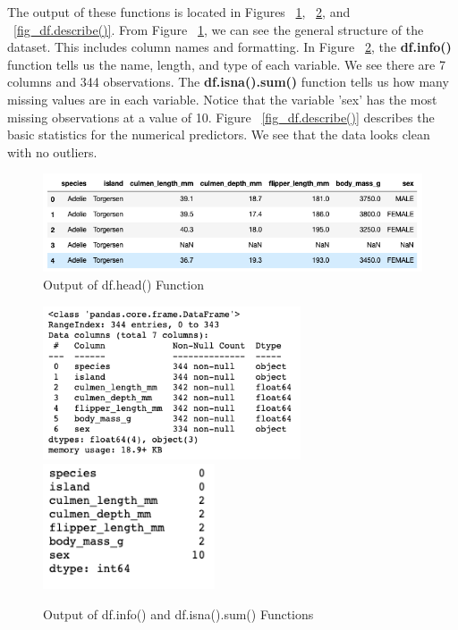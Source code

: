 \documentclass[12pt]{article}
\begin{document}
The output of these functions is located in Figures ~\ref{fig_df.head()}, ~\ref{fig_df.info()_df.isna().sum()}, and ~\ref{fig_df.describe()}. From Figure ~\ref{fig_df.head()}, we can see the general structure of the dataset. This includes column names and formatting. In Figure ~\ref{fig_df.info()_df.isna().sum()}, the \textbf{df.info()} function tells us the name, length, and type of each variable. We see there are 7 columns and 344 observations. The \textbf{df.isna().sum()} function tells us how many missing values are in each variable. Notice that the variable 'sex' has the most missing observations at a value of 10. Figure ~\ref{fig_df.describe()} describes the basic statistics for the numerical predictors. We see that the data looks clean with no outliers.

\begin{figure}[H]
    \centering
    \includegraphics[width=5in]{Figures/penguins/df.head().png}
    \caption{Output of df.head() Function}
    \label{fig_df.head()}
\end{figure}

\begin{figure}[H]
    \centering
    \includegraphics[width=3in]{Figures/penguins/df.info().png}
    \includegraphics[width=2in]{Figures/penguins/df.isna().sum().png}
    \caption{Output of df.info() and df.isna().sum() Functions}
    \label{fig_df.info()_df.isna().sum()}
\end{figure}
\end{document}
